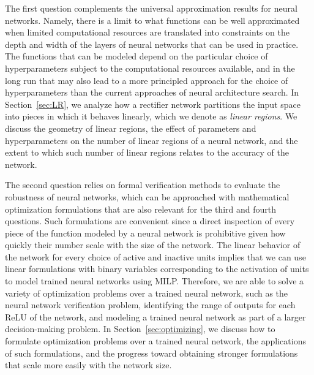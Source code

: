 The first question complements the universal approximation results for neural networks. Namely, there is a limit to what functions can be well approximated when limited computational resources are translated into constraints on the depth and width of the layers of neural networks that can be used in practice. 
The functions that can be modeled depend on the particular choice of hyperparameters subject to the computational resources available, and in the long run that may also lead to a more principled approach for the choice of hyperparameters than the current approaches of neural architecture search. 
%
In Section~\ref{sec:LR}, 
we analyze how a rectifier network partitions the input space into pieces in which it behaves linearly, which we denote as \emph{linear regions}. 
We discuss the geometry of linear regions, the effect of parameters and hyperparameters on the number of linear regions of a neural network, and the extent to which such number of linear regions relates to the accuracy of the network. 

The second question relies on formal verification methods to evaluate the robustness of neural networks, which can be approached with mathematical optimization formulations that are also relevant for the third and fourth questions. Such formulations are convenient since a direct inspection of every piece of the function modeled by a neural network is prohibitive given how quickly their number scale with the size of the network. 
The linear behavior of the network for every choice of active and inactive units implies that we can use linear formulations with binary variables corresponding to the activation of units to model trained neural networks using MILP.  Therefore, we are able to solve a variety of optimization problems over a trained neural network, such as the neural network verification problem, 
identifying the range of outputs for each ReLU of the network, and modeling a trained neural network as part of a larger decision-making problem. 
%
In Section~\ref{sec:optimizing}, we discuss how to formulate optimization problems over a trained neural network, the applications of such formulations, and the progress toward obtaining stronger formulations that scale more easily with the network size.

